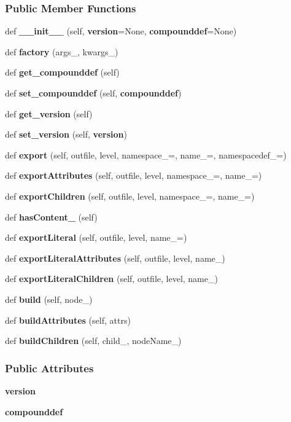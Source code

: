 \subsubsection*{Public Member Functions}
\begin{DoxyCompactItemize}
\item 
def {\bf \+\_\+\+\_\+init\+\_\+\+\_\+} (self, {\bf version}=None, {\bf compounddef}=None)
\item 
def {\bf factory} (args\+\_\+, kwargs\+\_\+)
\item 
def {\bf get\+\_\+compounddef} (self)
\item 
def {\bf set\+\_\+compounddef} (self, {\bf compounddef})
\item 
def {\bf get\+\_\+version} (self)
\item 
def {\bf set\+\_\+version} (self, {\bf version})
\item 
def {\bf export} (self, outfile, level, namespace\+\_\+=\textquotesingle{}\textquotesingle{}, name\+\_\+=\textquotesingle{}, namespacedef\+\_\+=\textquotesingle{}\textquotesingle{})
\item 
def {\bf export\+Attributes} (self, outfile, level, namespace\+\_\+=\textquotesingle{}\textquotesingle{}, name\+\_\+=\textquotesingle{})
\item 
def {\bf export\+Children} (self, outfile, level, namespace\+\_\+=\textquotesingle{}\textquotesingle{}, name\+\_\+=\textquotesingle{})
\item 
def {\bf has\+Content\+\_\+} (self)
\item 
def {\bf export\+Literal} (self, outfile, level, name\+\_\+=\textquotesingle{})
\item 
def {\bf export\+Literal\+Attributes} (self, outfile, level, name\+\_\+)
\item 
def {\bf export\+Literal\+Children} (self, outfile, level, name\+\_\+)
\item 
def {\bf build} (self, node\+\_\+)
\item 
def {\bf build\+Attributes} (self, attrs)
\item 
def {\bf build\+Children} (self, child\+\_\+, node\+Name\+\_\+)
\end{DoxyCompactItemize}
\subsubsection*{Public Attributes}
\begin{DoxyCompactItemize}
\item 
{\bf version}
\item 
{\bf compounddef}
\end{DoxyCompactItemize}

